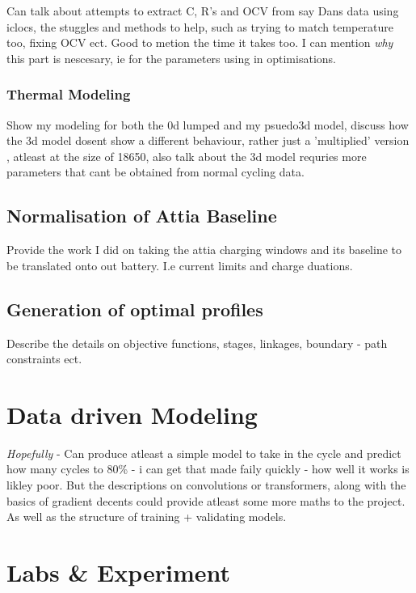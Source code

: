 \documentclass[12pt]{article}
\begin{document}
Can talk about attempts to extract C, R's and OCV from say Dans data using iclocs, the stuggles and methods to help, such as trying to match temperature too, fixing OCV ect. Good to metion the time it takes too. I can mention \textit{why} this part is nescesary, ie for the parameters using in optimisations.

\subsubsection{Thermal Modeling}

Show my modeling for both the 0d lumped and my psuedo3d model, discuss how the 3d model dosent show a different behaviour, rather just a 'multiplied' version , atleast at the size of 18650, also talk about the 3d model requries more parameters that cant be obtained from normal cycling data.

\subsection{Normalisation of Attia Baseline}

Provide the work I did on taking the attia charging windows and its baseline to be translated onto out battery. I.e current limits and charge duations.

\subsection{Generation of optimal profiles}

Describe the details on objective functions, stages, linkages, boundary - path constraints ect.

\section{Data driven Modeling}

\textit{Hopefully} - Can produce atleast a simple model to take in the cycle and predict how many cycles to 80\% - i can get that made faily quickly - how well it works is likley poor. But the descriptions on convolutions or transformers, along with the basics of gradient decents could provide atleast some more maths to the project. As well as the structure of training + validating models.

\section{Labs \& Experiment}
\end{document}
